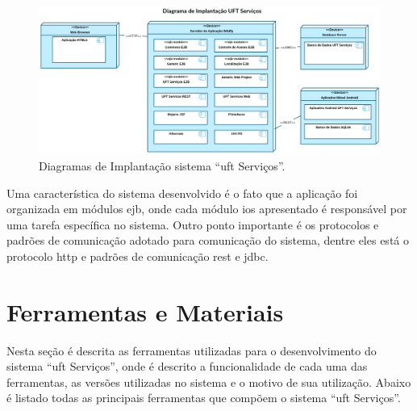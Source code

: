 \begin{figure}[H]
 \centering
 \includegraphics[width=1\textwidth]{figuras/deployment_diagram} 
 \caption{Diagramas de Implantação sistema ``\acrshort{uft} Serviços''.}
 \label{deployment_diagram} 
\end{figure}

Uma característica do sistema desenvolvido é o fato que a aplicação foi organizada em módulos \gls{ejb}, onde cada módulo \acrshort{ios} apresentado é responsável por uma tarefa específica no sistema. Outro ponto importante é os protocolos e padrões de comunicação adotado para comunicação do sistema, dentre eles está o protocolo \acrshort{http} e padrões de comunicação \acrshort{rest} e \gls{jdbc}.

\section{Ferramentas e Materiais}

\noindent Nesta seção é descrita as ferramentas utilizadas para o desenvolvimento do sistema ``\acrshort{uft} Serviços'', onde é descrito a funcionalidade de cada uma das ferramentas, as versões utilizadas no sistema e o motivo de sua utilização. Abaixo é listado todas as principais ferramentas que compõem o sistema ``\acrshort{uft} Serviços''.

